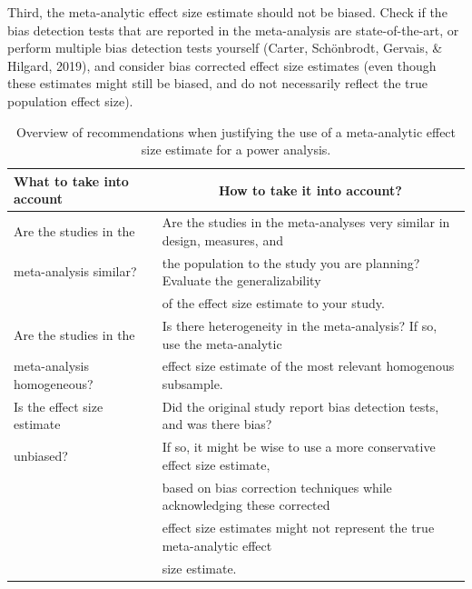 \documentclass[
  english,
  ,jou, a4paper,floatsintext]{apa6}
\begin{document}
Third, the meta-analytic effect size estimate should not be biased. Check if the bias detection tests that are reported in the meta-analysis are state-of-the-art, or perform multiple bias detection tests yourself (Carter, Schönbrodt, Gervais, \& Hilgard, 2019), and consider bias corrected effect size estimates (even though these estimates might still be biased, and do not necessarily reflect the true population effect size).

\begin{table}[tbp]

\begin{center}
\begin{threeparttable}

\caption{\label{tab:tablemetajust}Overview of recommendations when justifying the use of a meta-analytic effect size estimate for a power analysis.}

\begin{tabular}{ll}
\toprule
What to take into account & \multicolumn{1}{c}{How to take it into account?}\\
\midrule
Are the studies in the & Are the studies in the meta-analyses very similar in design, measures, and\\
meta-analysis similar? & the population to the study you are planning? Evaluate the generalizability\\
 & of the effect size estimate to your study.\\ \midrule
Are the studies in the & Is there heterogeneity in the meta-analysis? If so, use the meta-analytic\\
meta-analysis homogeneous? & effect size estimate of the most relevant homogenous subsample.\\ \midrule
Is the effect size estimate & Did the original study report bias detection tests, and was there bias?\\
unbiased? & If so, it might be wise to use a more conservative effect size estimate,\\
 & based on bias correction techniques while acknowledging these corrected\\
 & effect size estimates might not represent the true meta-analytic effect\\
 & size estimate.\\
\bottomrule
\end{tabular}

\end{threeparttable}
\end{center}

\end{table}
\end{document}
